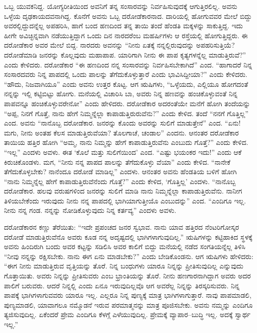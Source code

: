 ಒಬ್ಬ ಯುವಕನಿದ್ದ. ಯೋಗ್ಯರೀತಿಯಿಂದ ಅವನಿಗೆ ತನ್ನ ಸಂಸಾರವನ್ನು ನಿರ್ವಹಿಸುವುದಕ್ಕೆ ಆಗುತ್ತಿರಲಿಲ್ಲ. ಅವನು ಒಳ್ಳೆಯ ದೃಢಕಾಯದವನಾಗಿದ್ದ. ಕೊನೆಗೆ ಅವನು ಒಬ್ಬ ದರೋಡೆಕಾರನಾದ. ದಾರಿಯಲ್ಲಿ ಹೋಗುವವರ ಮೇಲೆ ಬಿದ್ದು ಅವರಲ್ಲಿದ್ದುದನ್ನೆಲ್ಲ ಅಪಹರಿಸಿ, ಹಾಗೆ ಬಂದ ಹಣದಿಂದ ತನ್ನ ತಾಯಿ ತಂದೆ ಹೆಂಡತಿ ಮಕ್ಕಳನ್ನು ಸಾಕುತ್ತಿದ್ದ. ಇದು ಹೀಗೇ ಅವಿಚ್ಛಿನ್ನವಾಗಿ ನಡೆಯುತ್ತಿದ್ದಾಗ ಒಂದು ದಿನ ನಾರದರೆಂಬ ಮಹರ್ಷಿಗಳು ಆ ರಸ್ತೆಯಲ್ಲಿ ಹೋಗುತ್ತಿದ್ದರು. ಈ ದರೋಡೆಕಾರ ಅವರ ಮೇಲೆ ಬಿದ್ದ. ನಾರದರು ಅವನನ್ನು “ನೀನು ಏತಕ್ಕೆ ನನ್ನಲ್ಲಿರುವುದನ್ನು ಅಪಹರಿಸುತ್ತಿಯೆ? ದರೋಡೆಮಾಡಿ ಜನರನ್ನು ಕೊಲ್ಲವುದು ಮಹಾಪಾಪ. ಯಾರಿಗಾಗಿ ನೀನು ಈ ಪಾಪ ಕೃತ್ಯಗಳನ್ನೆಲ್ಲ ಮಾಡುತ್ತಿರುವೆ?” ಎಂದು ಕೇಳಿದರು. ದರೋಡೆಕಾರ “ಈ ಹಣದಿಂದ ನನ್ನ ಸಂಸಾರವನ್ನು ನಿರ್ವಹಿಸಬೇಕಾಗಿದೆ” ಎಂದ. “ಹಾಗಾದರೆ ನಿನ್ನ ಸಂಸಾರದವರು ನಿನ್ನ ಪಾಪದಲ್ಲಿ ಒಂದು ಪಾಲನ್ನು ತೆಗೆದುಕೊಳ್ಳುತ್ತಾರೆ ಎಂದು ಭಾವಿಸಿದ್ದೀಯಾ?” ಎಂದು ಕೇಳಿದರು. “ಹೌದು, ನಿಜವಾಗಿಯೂ” ಎಂದು ಅವನು ಉತ್ತರ ಕೊಟ್ಟ. ಆಗ ಋಷಿಗಳು, “ಒಳ್ಳೆಯದು, ಎಲ್ಲಿಯೂ ಹೋಗದಂತೆ ನನ್ನನ್ನು ಇಲ್ಲಿ ಕಟ್ಟಿಬಿಟ್ಟು ಹೋಗು. ಮನೆಯಲ್ಲಿ ವಿಚಾರಿಸಿ ಬಾ, ಅವರು ನಿನ್ನ ಹಣವನ್ನು ಹಂಚಿಕೊಳ್ಳುವಂತೆ ನಿನ್ನ ಪಾಪವನ್ನೂ ಹಂಚಿಕೊಳ್ಳುವರೇನೋ” ಎಂದು ಹೇಳಿದರು. ದರೋಡೆಕಾರ ಅದರಂತೆಯೇ ಮನೆಗೆ ಹೋಗಿ ತಂದೆಯನ್ನು “ಅಪ್ಪ, ನಿನಗೆ ಗೊತ್ತೆ, ನಾನು ಹೇಗೆ ನಿಮ್ಮನ್ನೆಲ್ಲಾ ಕಾಪಾಡುತ್ತಿರುರುವೆನು?” ಎಂದು ಕೇಳಿದ. ತಂದೆ “ನನಗೆ ಗೊತ್ತಿಲ್ಲ” ಎಂದ. ಅವನು “ನಾನೊಬ್ಬ ದರೋಡೆಕಾರ. ಜನರನ್ನು ಕೊಂದು ಅವರನ್ನು ಸುಲಿಗೆ ಮಾಡುತ್ತೇನೆ” ಎಂದ. “ಏನು!ಮಗು, ನೀನು ಅಂತಹ ಕೆಲಸ ಮಾಡುತ್ತಿರುವೆಯಾ? ತೊಲಗಾಚೆ, ಚಂಡಾಲ” ಎಂದನು. ಆನಂತರ ದರೋಡೆಕಾರ ತಾಯಿಯ ಹತ್ತಿರ ಹೋಗಿ “ಅಮ್ಮ, ನಾನು ನಿಮ್ಮನ್ನು ಹೇಗೆ ಕಾಪಾಡುತ್ತಿರುವೆನು ಎಂಬುದು ಗೊತ್ತೆ?” ಎಂದು ಕೇಳಿದ. “ಇಲ್ಲ” ಎಂದಳು ಅವಳು. ಈತ ‘ಕೊಲೆ ಮತ್ತು ಸುಲಿಗೆಯಿಂದ’ ಎಂದ. “ಎಷ್ಟು ಭಯಂಕರ ಇದು!” ಎಂದು ಆಕೆ ಕಿರುಚಿಕೊಂಡಳು. ಮಗ, “ನೀನು ನನ್ನ ಪಾಪದ ಪಾಲನ್ನು ತೆಗೆದುಕೊಳ್ಳು ವೆಯಾ” ಎಂದು ಕೇಳಿದ. “ನಾನೇಕೆ ತೆಗೆದುಕೊಳ್ಳಬೇಕು? ನಾನೆಂದೂ ದರೋಡೆ ಮಾಡಿಲ್ಲ” ಎಂದಳು. ಆನಂತರ ಅವನು ಹೆಂಡತಿಯ ಬಳಿಗೆ ಹೋಗಿ “ನಾನು ನಿಮ್ಮನ್ನೆಲ್ಲ ಹೇಗೆ ಕಾಪಾಡುತ್ತಿರುವೆನೆಂದು ಗೊತ್ತೆ?” ಎಂದು ಕೇಳಿದ, ‘ಗೊತ್ತಿಲ್ಲ’ ಎಂದಳು. “ನಾನೊಬ್ಬ ದರೋಡೆಕಾರ. ಹಲವು ವರುಷಗಳಿಂದ ಜನರನ್ನು ಸುಲಿಗೆ ಮಾಡಿ ನಾನು ನಿಮ್ಮನ್ನೆಲ್ಲಾ ಕಾಪಾಡುತ್ತಿರುವೆನು. ನಾನೀಗ ತಿಳಿಯಬೇಕೆಂದು ಇರುವುದು ನೀನು ನನ್ನ ಪಾಪದಲ್ಲಿ ಭಾಗಿಯಾಗುತ್ತೀಯೊ ಎಂಬುದನ್ನು” ಎಂದ. “ಎಂದಿಗೂ ಇಲ್ಲ. ನೀನು ನನ್ನ ಗಂಡ. ನನ್ನನ್ನು ನೋಡಿಕೊಳ್ಳುವುದು ನಿನ್ನ ಕರ್ತವ್ಯ” ಎಂದಳು ಅವಳು.

ದರೋಡೆಕಾರನ ಕಣ್ಣು ತೆರೆಯಿತು: “ಇದೇ ಪ್ರಪಂಚದ ಜನರ ಸ್ವಭಾವ. ನಾನು ಯಾವ ಹತ್ತಿರದ ನೆಂಟರಿಗೋಸ್ಕರ ದರೋಡೆ ಮಾಡುತ್ತಿರುವೆನೊ ಅವರು ಕೂಡ ನನ್ನ ಅದೃಷ್ಟದಲ್ಲಿ ಭಾಗಿಗಳಾಗುವುದಿಲ್ಲ.” ಋಷಿಗಳನ್ನು ಕಟ್ಟಿಹಾಕಿದ ಸ್ಥಳಕ್ಕೆ ಅವನು ಹಿಂದಿರುಗಿ ಬಂದು ಅವರ ಕಟ್ಟನ್ನು ಸಡಿಲಿಸಿ ಅವರ ಕಾಲಿಗೆ ಬಿದ್ದು ಮನೆಯಲ್ಲಿ ನಡೆದ ಸಂಗತಿಯನ್ನೆಲ್ಲ ತಿಳಿಸಿ “ನೀವು ನನ್ನನ್ನು ರಕ್ಷಿಸಬೇಕು. ನಾನು ಈಗ ಏನು ಮಾಡಬೇಕು?” ಎಂದು ಬೇಡಿಕೊಂಡನು. ಆಗ ಋಷಿಗಳು ಹೇಳಿದರು: “ಈಗ ನೀನು ಮಾಡುತ್ತಿರುವ ವೃತ್ತಿಯನ್ನು ತೊರೆ. ನಿನ್ನ ಬಂಧುಗಳು ಯಾರೂ ನಿನ್ನನ್ನು ಪ್ರೀತಿಸುವುದಿಲ್ಲ ಎನ್ನುವುದು ಗೊತ್ತಾಯಿತು. ಅವರು ನಿನ್ನನ್ನು ಪ್ರೀತಿಸುವರು ಎಂಬ ಭ್ರಾಂತಿಯನ್ನು ತೊರೆ. ನೀನು ಹಣಗಾರನಾಗಿದ್ದಾಗ ಅವರು ಅದರ ಪಾಲಿಗೆ ಬರುವರು. ಆದರೆ ನಿನ್ನಲ್ಲಿ ಎಂದು ಏನೂ ಇರುವುದಿಲ್ಲವೊ ಆಗ ಅವರೆಲ್ಲ ನಿನ್ನನ್ನು ತಿರಸ್ಕರಿಸುವರು. ನಿನ್ನ ಪಾಪಕ್ಕೆ ಭಾಗಿಗಳಾಗುವವರು ಯಾರೂ ಇಲ್ಲ. ಎಲ್ಲರೂ ನಿನ್ನ ಪುಣ್ಯಕ್ಕೆ ಮಾತ್ರ ಭಾಗಿಗಳಾಗುತ್ತಾರೆ. ನಾವು ಪಾಪಮಾಡಲಿ, ಪುಣ್ಯಮಾಡಲಿ, ಯಾವಾಗಲೂ ನಮ್ಮೊಡನೆ ಇರುವ ಪರಮಾತ್ಮನನ್ನು ಮಾತ್ರ ಪೂಜಿಸಬೇಕು. ಅವನು ನಮ್ಮನ್ನು ಎಂದಿಗೂ ತ್ಯಜಿಸುವುದಿಲ್ಲ. ಏಕೆಂದರೆ ಪ್ರೇಮ ಎಂದಿಗೂ ಕೆಳಗ್ಗೆ ಎಳೆಯುವುದಿಲ್ಲ. ಪ್ರೇಮಕ್ಕೆ ವ್ಯಾಪಾರ–ಬುದ್ಧಿ ಇಲ್ಲ. ಅದಕ್ಕೆ ಸ್ವಾರ್ಥ ಇಲ್ಲ.”


